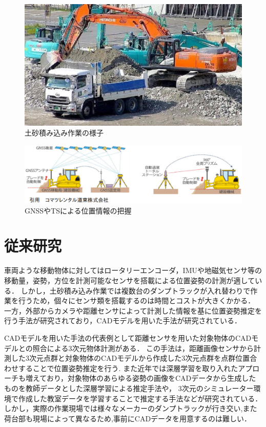 \begin{figure}[b]
    \begin{center}
    \includegraphics[width=0.8\columnwidth]{./chap1/fig/dosha.eps}
    \caption{土砂積み込み作業の様子}
    \label{fig:dosha}
    \end{center}
\end{figure}
 
\begin{figure}[b]
 \begin{center}
 \includegraphics[width=0.8\columnwidth]{./chap1/fig/gnss.eps}
 \caption{GNSSやTSによる位置情報の把握}
 \label{fig:GNSS}
 \end{center}
\end{figure}

\newpage

\section{従来研究}
車両ような移動物体に対してはロータリーエンコーダ，IMUや地磁気センサ等の移動量，姿勢，方位を計測可能なセンサを搭載による位置姿勢の計測が適している．
しかし，土砂積み込み作業では複数台のダンプトラックが入れ替わりで作業を行うため，個々にセンサ類を搭載するのは時間とコストが大きくかかる．
一方，外部からカメラや距離センサによって計測した情報を基に位置姿勢推定を行う手法が研究されており，CADモデルを用いた手法が研究されている\cite{中原智治2001}\cite{西卓郎2014}．
\par
CADモデルを用いた手法の代表例として距離センサを用いた対象物体のCADモデルとの照合による3次元物体計測がある\cite{林2008}．
この手法は，距離画像センサから計測した3次元点群と対象物体のCADモデルから作成した3次元点群を点群位置合わせすることで位置姿勢推定を行う.
また近年では深層学習を取り入れたアプローチも増えており，対象物体のあらゆる姿勢の画像をCADデータから生成したものを教師データとした深層学習による推定手法\cite{Sundermeyer2018}や，
3次元のシミュレーター環境で作成した教室データを学習することで推定する手法\cite{Tremblay2018}などが研究されている．
しかし，実際の作業現場では様々なメーカーのダンプトラックが行き交い,また荷台部も現場によって異なるため,事前にCADデータを用意するのは難しい．

